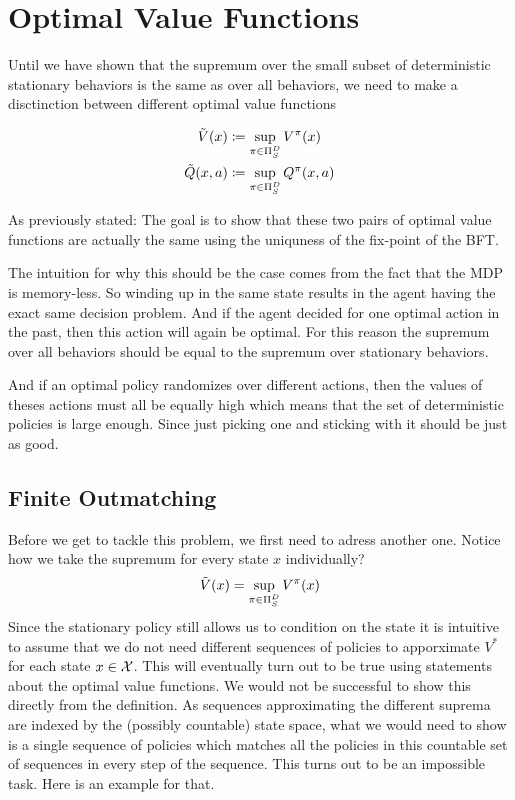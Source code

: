 \section{Optimal Value Functions}
Until we have shown that the supremum over the small subset of deterministic stationary behaviors is the same as over all behaviors, we need to make a disctinction between different optimal value functions

\begin{definition}
\begin{align*}
	\tilde{V}(x)&\coloneqq \sup_{\pi\in\Pi_S^D} V^\pi(x)\\
	\tilde{Q}(x,a)&\coloneqq \sup_{\pi\in\Pi_S^D} Q^\pi(x,a)
\end{align*}
\end{definition}

As previously stated: The goal is to show that these two pairs of optimal value functions are actually the same using the uniquness of the fix-point of the BFT. 

The intuition for why this should be the case comes from the fact that the MDP is memory-less. So winding up in the same state results in the agent having the exact same decision problem. And if the agent decided for one optimal action in the past, then this action will again be optimal. For this reason the supremum over all behaviors should be equal to the supremum over stationary behaviors. 

And if an optimal policy randomizes over different actions, then the values of theses actions must all be equally high which means that the set of deterministic policies is large enough. Since just picking one and sticking with it should be just as good.

\subsection{Finite Outmatching}
Before we get to tackle this problem, we first need to adress another one. Notice how we take the supremum for every state \(x\) individually? 
\begin{equation*}
\tilde{V}(x)=\sup_{\pi\in\Pi_S^D}V^\pi(x) 
\end{equation*}
Since the stationary policy still allows us to condition on the state it is intuitive to assume that we do not need different sequences of policies to apporximate \(V^*\) for each state \(x\in\mathcal{X}\). This will eventually turn out to be true using statements about the optimal value functions. We would not be successful to show this directly from the definition. As sequences approximating the different suprema are indexed by the (possibly countable) state space, what we would need to show is a single sequence of policies which matches all the policies in this countable set of sequences in every step of the sequence. This turns out to be an impossible task. Here is an example for that. 

